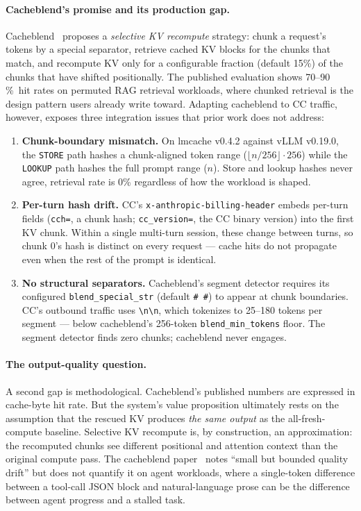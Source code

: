 \paragraph{Cacheblend's promise and its production gap.}
Cacheblend~\cite{lmcache-cacheblend} proposes a \emph{selective KV
recompute} strategy: chunk a request's tokens by a special separator,
retrieve cached KV blocks for the chunks that match, and recompute KV
only for a configurable fraction (default 15\%) of the chunks that
have shifted positionally. The published evaluation shows
70--90\,\%~hit rates on permuted RAG retrieval workloads, where
chunked retrieval is the design pattern users already write toward.
Adapting cacheblend to CC traffic, however, exposes three integration
issues that prior work does not address:

\begin{enumerate}
\item \textbf{Chunk-boundary mismatch.} On lmcache v0.4.2 against
vLLM v0.19.0, the \texttt{STORE} path hashes a chunk-aligned token range
($\lfloor n/256 \rfloor \cdot 256$) while the \texttt{LOOKUP} path hashes the full
prompt range ($n$). Store and lookup hashes never agree, retrieval rate
is 0\% regardless of how the workload is shaped.
\item \textbf{Per-turn hash drift.} CC's \texttt{x-anthropic-billing-header}
embeds per-turn fields (\texttt{cch=}, a chunk hash; \texttt{cc\_version=},
the CC binary version) into the first KV chunk. Within a single
multi-turn session, these change between turns, so chunk 0's hash is
distinct on every request --- cache hits do not propagate even when the
rest of the prompt is identical.
\item \textbf{No structural separators.} Cacheblend's segment detector
requires its configured \texttt{blend\_special\_str} (default \texttt{\#\,\#})
to appear at chunk boundaries. CC's outbound traffic uses \texttt{\textbackslash n\textbackslash n}, which
tokenizes to 25--180 tokens per segment --- below cacheblend's 256-token
\texttt{blend\_min\_tokens} floor. The segment detector finds zero
chunks; cacheblend never engages.
\end{enumerate}

\paragraph{The output-quality question.}
A second gap is methodological. Cacheblend's published numbers are
expressed in cache-byte hit rate. But the system's value proposition
ultimately rests on the assumption that the rescued KV produces
\emph{the same output} as the all-fresh-compute baseline. Selective
KV recompute is, by construction, an approximation: the recomputed
chunks see different positional and attention context than the
original compute pass. The cacheblend paper~\cite{lmcache-cacheblend}
notes ``small but bounded quality drift'' but does not quantify it on
agent workloads, where a single-token difference between a tool-call
JSON block and natural-language prose can be the difference between
agent progress and a stalled task.

